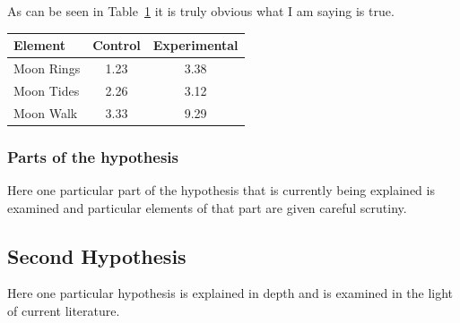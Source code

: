 As can be seen in Table~\ref{nothingelse} it is
truly obvious what I am saying is true.


\begin{table} \centering
{}
\label{nothingelse}
\begin{tabular}{lcc} \hline
\textbf{Element} & \textbf{Control} & \textbf{Experimental} \\ \hline
Moon Rings & 1.23 & 3.38 \\
Moon Tides & 2.26 & 3.12 \\
Moon Walk & 3.33 & 9.29 \\ \hline
\end{tabular}
\end{table}

\subsubsection{Parts of the hypothesis}

Here one particular part of the hypothesis that is 
currently being explained is examined and particular
elements of that part are given careful scrutiny.



\subsection{Second Hypothesis}

Here one particular hypothesis is explained in depth
and is examined in the light of current literature.

